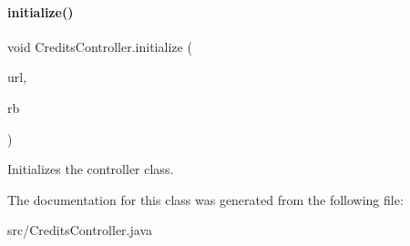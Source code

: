 \paragraph{\texorpdfstring{initialize()}{initialize()}}
{\footnotesize\ttfamily void Credits\+Controller.\+initialize (\begin{DoxyParamCaption}\item[{U\+RL}]{url,  }\item[{Resource\+Bundle}]{rb }\end{DoxyParamCaption})\hspace{0.3cm}{\ttfamily [inline]}}

Initializes the controller class. 

The documentation for this class was generated from the following file\+:\begin{DoxyCompactItemize}
\item 
src/Credits\+Controller.\+java\end{DoxyCompactItemize}

